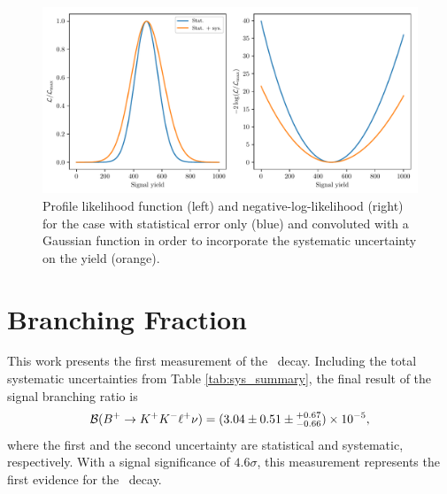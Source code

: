 \begin{figure}[H]
	\centering
	\captionsetup{width=0.8\linewidth}
	\includegraphics[width=\linewidth]{fig/significance}
	\caption{Profile likelihood function (left) and negative-log-likelihood (right) for the case with statistical error only (blue) and convoluted with a Gaussian function in order to incorporate the systematic uncertainty on the yield (orange).}
	\label{fig:significance}
\end{figure}


\section{Branching Fraction}

This work presents the first measurement of the \decayb~decay. Including the total systematic uncertainties from Table \ref{tab:sys_summary}, the final result of the signal branching ratio is
\begin{equation}
\mathcal{B}(B^+ \to K^+ K^- \ell^+ \nu) = (3.04 \pm 0.51 \pm {}^{+0.67}_{-0.66})\times 10^{-5},
\end{equation}
where the first and the second uncertainty are statistical and systematic, respectively. With a signal significance of $4.6\sigma$, this measurement represents the first evidence for the \decayb~decay.

